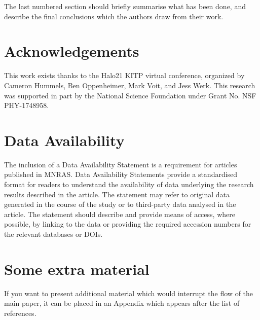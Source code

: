 \documentclass[fleqn,usenatbib]{mnras}
\begin{document}
The last numbered section should briefly summarise what has been done, and describe
the final conclusions which the authors draw from their work.

\section*{Acknowledgements}

This work exists thanks to the Halo21 KITP virtual conference, organized by Cameron Hummels, Ben Oppenheimer, Mark Voit, and Jess Werk.
This research was supported in part by the National Science Foundation under Grant No. NSF PHY-1748958.

\section*{Data Availability}

 
The inclusion of a Data Availability Statement is a requirement for articles published in MNRAS. Data Availability Statements provide a standardised format for readers to understand the availability of data underlying the research results described in the article. The statement may refer to original data generated in the course of the study or to third-party data analysed in the article. The statement should describe and provide means of access, where possible, by linking to the data or providing the required accession numbers for the relevant databases or DOIs.










\appendix

\section{Some extra material}

If you want to present additional material which would interrupt the flow of the main paper,
it can be placed in an Appendix which appears after the list of references.



\bsp	%
\label{lastpage}
\end{document}
